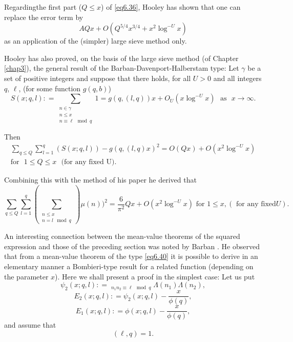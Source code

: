 Regarding\pageoriginale the first part ($Q \leq x$) of \eqref{eq6.36},
Hooley \cite{key5} has shown that one can replace the error term by  
\begin{equation*}
AQx + O(Q^{5/4}x^{3/4}+x^2 \log^{-U}x) \tag{6.38}\label{eq6.38} 
\end{equation*}
as an application of the (simpler) large sieve method only.

Hooley \cite{key8} has also proved, on the basis of the large sieve method
(of Chapter \ref{chap3}),  the general result of the
Barban-Davenport-Halberstam type: Let $\gamma$ be a set of positive integers
and suppose that there holds, for all $U > 0$ and all integers $q$, $\ell$,
(for some function $g(q,b)$)  
\begin{equation*}
S(x;q,l): = \sum_{\substack{n \in \gamma \\{n \leq x}\\ {n \equiv \ell
      \mod q}}}  1  = g(q,(l,q)) x + O_U(x \log^{-U}x)\text{~ as~ } x \to
\infty .\tag{6.39}\label{eq6.39}  
\end{equation*}

Then
\begin{gather*}
\sum_{q \leq Q} \sum^{q}_{l=1}(S(x;q,l))-g(q , (l,q)x)^2  = O(Qx) + O(x^2
\log^{-U}x)\\
 \text{for~ } 1 \leq Q \leq x \text{~~(for any fixed
  U)}. \tag{6.40}\label{eq6.40}  
\end{gather*} 

Combining this with the method of his paper \cite{key5} he derived that
{\fontsize{10pt}{12pt}\selectfont
\begin{equation*}
\sum_{q \leq Q} \sum^{q}_{l=1} (\sum _{\substack {n \leq x\\ {n=l \mod
      q}}}) \mu (n))^2 = \frac{6}{\pi^2}Qx + O (x^2 \log^{-U }x)
\text{ for } 1\leq x, (\text{ for any fixed
}U). \tag{6.41}\label{eq6.41}  
\end{equation*}}\relax  
  
An interesting connection between the mean-value theorems of the
squared expression and those of the preceding section was noted by
Barban \cite{key6}. He observed that from a mean-value theorem of the type
\eqref{eq6.40} it is possible to derive in an elementary manner a
Bombieri-type result for a related function (depending on the
parameter $x$). Here we shall present a proof in the simplest case:
Let us put 
\begin{equation*}
\psi _2 (x;q,l): = \mathop{\sum _{n_1 \leq x}\sum_{n_2 \leq
    x}}_{n_{1}n_{2}\equiv \ell \mod q}\Lambda (n_1)\Lambda (n_2),
\tag{6.42}\label{eq6.42}  
\end{equation*}      
\begin{equation*}
E_2(x;q,l): = \psi_2 (x;q,l)- \frac{x}{\phi (q)}, \tag{6.43}\label{eq6.43} 
\end{equation*} 
\begin{equation*}
E_1 (x;q,l): = \phi (x;q,l)-\frac{x}{\phi (q)}, \tag{6.44}\label{eq6.44} 
\end{equation*}\pageoriginale
and assume that
\begin{equation*}
(\ell,q)=1. \tag{6.45}\label{eq6.45} 
\end{equation*}  

